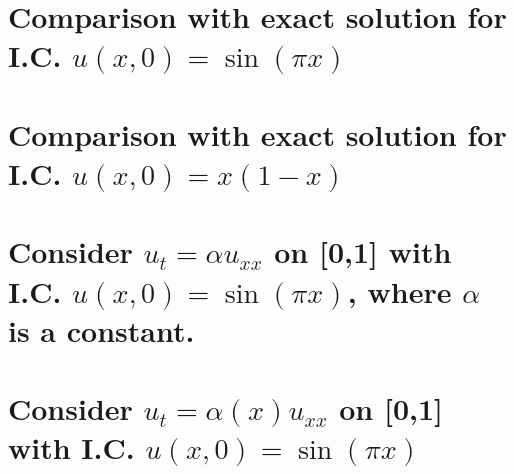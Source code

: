 \documentclass[11pt]{amsart}
\begin{document}
\section{Comparison with exact solution for  I.C. $u(x,0)= \sin(\pi x)$} 

\section{Comparison with exact solution for  I.C. $u(x,0)= x(1-x)$} 

\section{Consider $u_t = \alpha u_{xx}$ on [0,1] with I.C. $u(x,0)= \sin(\pi x)$, where $\alpha$ is a constant. }


\section{Consider $u_t = \alpha(x) u_{xx}$ on [0,1] with I.C. $u(x,0)= \sin(\pi x)$ }
\end{document}
